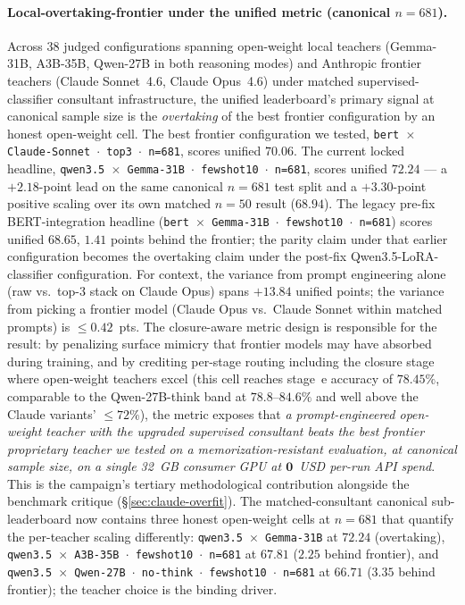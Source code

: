 \documentclass[11pt]{article}
\begin{document}
\paragraph{Local-overtaking-frontier under the unified metric (canonical $n{=}681$).} Across $38$ judged configurations spanning open-weight local teachers (Gemma-31B, A3B-35B, Qwen-27B in both reasoning modes) and Anthropic frontier teachers (Claude Sonnet~4.6, Claude Opus~4.6) under matched supervised-classifier consultant infrastructure, the unified leaderboard's primary signal at canonical sample size is the \emph{overtaking} of the best frontier configuration by an honest open-weight cell. The best frontier configuration we tested, \texttt{bert $\times$ Claude-Sonnet $\cdot$ top3 $\cdot$ n=681}, scores unified $\mathbf{70.06}$. The current locked headline, \texttt{qwen3.5 $\times$ Gemma-31B $\cdot$ fewshot10 $\cdot$ n=681}, scores unified $\mathbf{72.24}$ --- a $\boldsymbol{+2.18}$-point lead on the same canonical $n{=}681$ test split and a $\mathbf{+3.30}$-point positive scaling over its own matched $n{=}50$ result ($68.94$). The legacy pre-fix BERT-integration headline (\texttt{bert $\times$ Gemma-31B $\cdot$ fewshot10 $\cdot$ n=681}) scores unified $68.65$, $1.41$ points behind the frontier; the parity claim under that earlier configuration becomes the overtaking claim under the post-fix Qwen3.5-LoRA-classifier configuration. For context, the variance from prompt engineering alone (raw vs.\ top-3 stack on Claude Opus) spans $+13.84$ unified points; the variance from picking a frontier model (Claude Opus vs.\ Claude Sonnet within matched prompts) is $\leq 0.42$~pts. The closure-aware metric design is responsible for the result: by penalizing surface mimicry that frontier models may have absorbed during training, and by crediting per-stage routing including the closure stage where open-weight teachers excel (this cell reaches stage~e accuracy of $78.45\%$, comparable to the Qwen-27B-think band at $78.8$--$84.6\%$ and well above the Claude variants' $\leq 72\%$), the metric exposes that \emph{a prompt-engineered open-weight teacher with the upgraded supervised consultant beats the best frontier proprietary teacher we tested on a memorization-resistant evaluation, at canonical sample size, on a single 32~GB consumer GPU at $\mathbf{0}$~USD per-run API spend}. This is the campaign's tertiary methodological contribution alongside the benchmark critique (\S\ref{sec:claude-overfit}). The matched-consultant canonical sub-leaderboard now contains three honest open-weight cells at $n{=}681$ that quantify the per-teacher scaling differently: \texttt{qwen3.5 $\times$ Gemma-31B} at $72.24$ (overtaking), \texttt{qwen3.5 $\times$ A3B-35B $\cdot$ fewshot10 $\cdot$ n=681} at $67.81$ ($2.25$ behind frontier), and \texttt{qwen3.5 $\times$ Qwen-27B $\cdot$ no-think $\cdot$ fewshot10 $\cdot$ n=681} at $66.71$ ($3.35$ behind frontier); the teacher choice is the binding driver.
\end{document}
